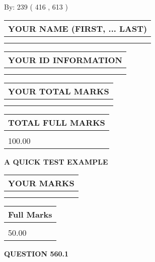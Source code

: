 \documentclass[12pt]{article}
\begin{document}
   
\hspace{1.0in} By: 
 239 ( 416 ,  613 )
   
   
   
   
\newpage 
\setcounter{page}{ 
   560001 } 
   
   
   
   
\noindent\begin{tabular}{|l|}
\hline
YOUR NAME (FIRST, ... LAST)  \\
\hline
 \\ 
 \\ 
\hline
\end{tabular}
\hspace{0.05in} \begin{tabular}{|l|}
\hline
 YOUR   ID   INFORMATION  \\
\hline
 \\ 
 \\ 
\hline
\end{tabular}
   
   
\vspace{0.2in}\noindent\begin{tabular}{|l|}
\hline
YOUR TOTAL MARKS  \\
\hline
 \\ 
 \\ 
\hline
\end{tabular}
\hspace{0.05in} \begin{tabular}{|l|}
\hline
TOTAL FULL MARKS  \\
\hline
 \\ 
100.00 \\
\hline
\end{tabular}
   
   
 \vspace{0.2in}
{\LARGE {\textbf{ A QUICK TEST EXAMPLE}}}
   
   
  
\vspace{0.2in}
  
\noindent\begin{tabular}{|l|}
\hline
 YOUR MARKS  \\
\hline
 \\ 
 \\ 
\hline
\end{tabular}
\hspace{0.05in} \begin{tabular}{|l|}
\hline
 Full Marks  \\
\hline
 \\ 
50.00 \\
\hline
\end{tabular}
{\textbf{\Large{QUESTION
560.1 
}}}
  
\end{document}
